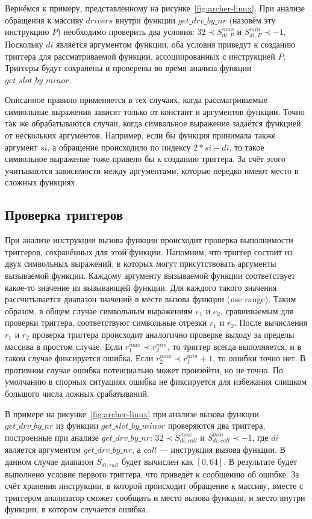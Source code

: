 Вернёмся к примеру, представленному на
рисунке~\ref{fig:archer-linux}. При анализе обращения к массиву
$drivers$ внутри функции $get\_drv\_by\_nr$ (назовём эту инструкцию
$P$) необходимо проверить два условия: $32 \prec S_{di, P}^{max}$ и
$S_{di, P}^{min} \prec -1$. Поскольку $di$ является аргументом
функции, оба условия приведут к созданию триггера для рассматриваемой
функции, ассоциированных с инструкцией $P$. Триггеры будут сохранены и
проверены во время анализа функции $get\_slot\_by\_minor$.

Описанное правило применяется в тех случаях, когда рассматриваемые
символьные выражения зависят только от констант и аргументов
функции. Точно так же обрабатываются случаи, когда символьное
выражение задаётся функцией от нескольких аргументов. Например, если
бы функция принимала также аргумент $si$, а обращение происходило по
индексу $2 * si - di$, то такое символьное выражение тоже привело бы к
созданию триггера. За счёт этого учитываются зависимости между
аргументами, которые нередко имеют место в сложных функциях.

\subsection{Проверка триггеров}

При анализе инструкции вызова функции происходит проверка выполнимости
триггеров, сохранённых для этой функции. Напомним, что триггер состоит
из двух символьных выражений, в которых могут присутствовать аргументы
вызываемой функции. Каждому аргументу вызываемой функции соответствует
какое-то значение из вызывающей функции. Для каждого такого значения
рассчитывается диапазон значений в месте вызова функции (use
range). Таким образом, в общем случае символьным выражениям $e_1$ и
$e_2$, сравниваемым для проверки триггера, соответствуют символьные
отрезки $r_1$ и $r_2$. После вычисления $r_1$ и $r_2$ проверка
триггера происходит аналогично проверке выходу за пределы массива в
простом случае. Если $r_1^{max} \prec r_2^{min}$, то триггер всегда
выполняется, и в таком случае фиксируется ошибка. Если
$r_2^{max} \prec r_1^{min} + 1$, то ошибки точно нет. В противном
случае ошибка потенциально может произойти, но не точно. По умолчанию
в спорных ситуациях ошибка не фиксируется для избежания слишком
большого числа ложных срабатываний.

В примере на рисунке~\ref{fig:archer-linux} при анализе вызова функции
$get\_drv\_by\_nr$ из функции $get\_slot\_by\_minor$ проверяются два
триггера, построенные при анализе $get\_drv\_by\_nr$:
$32 \prec S_{di, call}^{max}$ и $S_{di, call}^{min} \prec -1$, где
$di$ является аргументом $get\_drv\_by\_nr$, а $call$ --- инструкция
вызова функции. В данном случае диапазон $S_{di, call}$ будет вычислен
как $[0, 64]$. В результате будет выполнено условие первого триггера,
что приведёт к сообщению об ошибке. За счёт хранения инструкции, в
которой происходит обращение к массиву, вместе с триггером анализатор
сможет сообщить и место вызова функции, и место внутри функции, в
котором случается ошибка.

